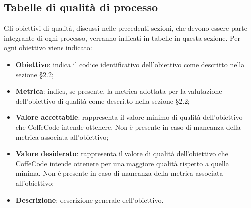 \documentclass[../piano-di-qualifica.tex]{subfiles}
\begin{document}
\subsection{Tabelle di qualità di processo}
\label{sub:tabelle_di_qualita_di_processo}
Gli obiettivi di qualità, discussi nelle precedenti sezioni, che devono essere parte integrante di ogni processo, verranno indicati in tabelle in questa sezione.
Per ogni obiettivo viene indicato:

\begin{itemize}
   \item \textbf{Obiettivo}: indica il codice identificativo dell'obiettivo come descritto nella sezione §2.2;
   \item \textbf{Metrica}: indica, se presente, la metrica adottata per la valutazione dell'obiettivo di qualità come descritto nella sezione §2.2;
   \item \textbf{Valore accettabile}: rappresenta il valore minimo di qualità dell'obiettivo che CoffeCode intende ottenere. Non è presente in caso di mancanza della metrica associata all'obiettivo;
   \item \textbf{Valore desiderato}: rappresenta il valore di qualità dell'obiettivo che CoffeCode intende ottenere per una maggiore qualità rispetto a quella minima. Non è presente in caso di mancanza della metrica associata all'obiettivo;
   \item \textbf{Descrizione}: descrizione generale dell'obiettivo.
\end{itemize}
\end{document}
